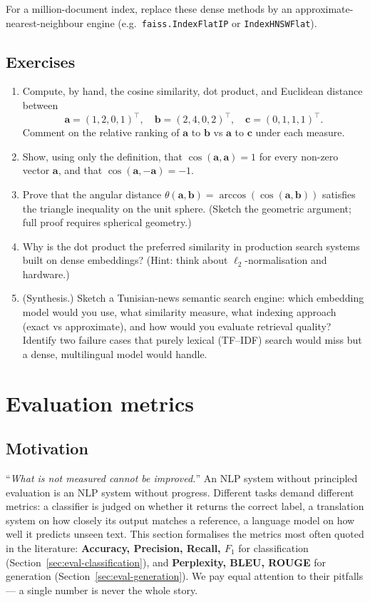 For a million-document index, replace these dense methods by an approximate-nearest-neighbour engine (e.g.\ \texttt{faiss.IndexFlatIP} or \texttt{IndexHNSWFlat}).

\subsection{Exercises}
\begin{enumerate}
    \item Compute, by hand, the cosine similarity, dot product, and Euclidean distance between
    \[ \mathbf{a} = (1, 2, 0, 1)^\top, \quad \mathbf{b} = (2, 4, 0, 2)^\top, \quad \mathbf{c} = (0, 1, 1, 1)^\top. \]
    Comment on the relative ranking of $\mathbf{a}$ to $\mathbf{b}$ vs $\mathbf{a}$ to $\mathbf{c}$ under each measure.
    \item Show, using only the definition, that $\cos(\mathbf{a}, \mathbf{a}) = 1$ for every non-zero vector $\mathbf{a}$, and that $\cos(\mathbf{a}, -\mathbf{a}) = -1$.
    \item Prove that the angular distance $\theta(\mathbf{a}, \mathbf{b}) = \arccos(\cos(\mathbf{a}, \mathbf{b}))$ satisfies the triangle inequality on the unit sphere. (Sketch the geometric argument; full proof requires spherical geometry.)
    \item Why is the dot product the preferred similarity in production search systems built on dense embeddings? (Hint: think about $\ell_2$-normalisation and hardware.)
    \item (Synthesis.) Sketch a Tunisian-news semantic search engine: which embedding model would you use, what similarity measure, what indexing approach (exact vs approximate), and how would you evaluate retrieval quality? Identify two failure cases that purely lexical (TF--IDF) search would miss but a dense, multilingual model would handle.
\end{enumerate}

\section{Evaluation metrics}
\label{sec:eval}

\subsection{Motivation}
``\emph{What is not measured cannot be improved.}'' An NLP system without principled evaluation is an NLP system without progress. Different tasks demand different metrics: a classifier is judged on whether it returns the correct label, a translation system on how closely its output matches a reference, a language model on how well it predicts unseen text. This section formalises the metrics most often quoted in the literature: \textbf{Accuracy, Precision, Recall, $F_1$} for classification (Section~\ref{sec:eval-classification}), and \textbf{Perplexity, BLEU, ROUGE} for generation (Section~\ref{sec:eval-generation}). We pay equal attention to their pitfalls --- a single number is never the whole story.

